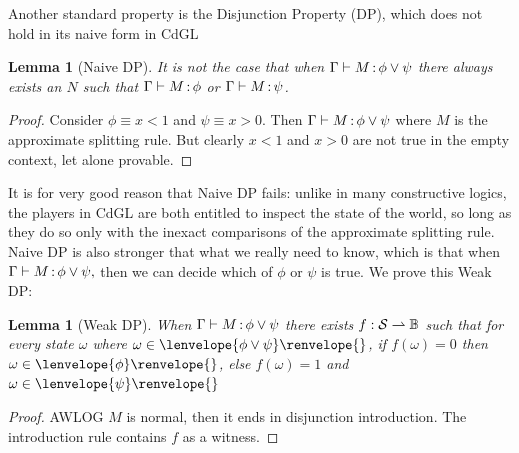 \documentclass[12pt]{cmuthesis}
\newtheorem{lemma}[theorem]{Lemma}
\theoremstyle{definition}
\theoremstyle{remark}
\newcommand{\allstate}{\mathcal{S}}
\newcommand{\CdGL}{\textsf{CdGL}\xspace}
\newcommand{\fint}[1]{\lenvelope{#1}\renvelope}
\begin{document}
Another standard property is the Disjunction Property (DP), which does not hold in its naive form in \CdGL
\begin{lemma}[Naive DP]
It is not the case that when $\Gamma \vdash M\mathop{:}\phi \lor \psi$ there always exists an $N$ such that $\Gamma \vdash M\mathop{:}\phi$ or $\Gamma \vdash M\mathop{:}\psi$.
\end{lemma}
\begin{proof}
  Consider $\phi \equiv x < 1$ and $\psi \equiv x > 0$.
  Then $\Gamma \vdash M\mathop{:}\phi \lor \psi$ where $M$ is the approximate splitting rule.
  But clearly $x < 1$ and $x > 0$ are not true in the empty context, let alone provable.
\end{proof}

It is for very good reason that Naive DP fails: unlike in many constructive logics, the players in \CdGL are both entitled to inspect the state of the world, so long as they do so only with the inexact comparisons of the approximate splitting rule.
Naive DP is also stronger that what we really need to know, which is that when $\Gamma \vdash M\mathop{:}\phi \lor \psi,$ then we can decide which of $\phi$ or $\psi$ is true.
We prove this Weak DP:
\begin{lemma}[Weak DP]
When $\Gamma \vdash M\mathop{:}\phi \lor \psi$ there exists $f : \allstate \mto \mathbb{B}$ such that for every state $\omega$ where $\omega \in \fint{\phi \lor \psi}{}$, if $f(\omega)=0$ then $\omega \in \fint{\phi}{}$, else $f(\omega)=1$ and $\omega \in \fint{\psi}{}
$\end{lemma}
\begin{proof}
  AWLOG $M$ is normal, then it ends in disjunction introduction.
  The introduction rule contains $f$ as a witness.
\end{proof}
\end{document}
